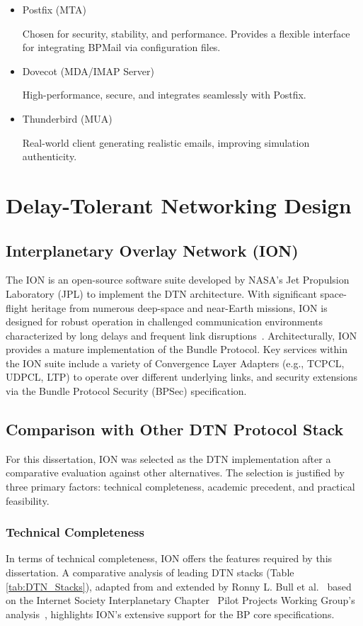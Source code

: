 \begin{itemize}
    \item Postfix (MTA)
    
    Chosen for security, stability, and performance. Provides a flexible interface for integrating BPMail via configuration files.
    \item Dovecot (MDA/IMAP Server)
    
    High-performance, secure, and integrates seamlessly with Postfix.
    \item Thunderbird (MUA)
    
    Real-world client generating realistic emails, improving simulation authenticity.
\end{itemize}

\section{Delay-Tolerant Networking Design}
\subsection{Interplanetary Overlay Network (ION)}
The ION is an open-source software suite developed by NASA's Jet Propulsion Laboratory (JPL) to implement the DTN architecture. With significant space-flight heritage from numerous deep-space and near-Earth missions, ION is designed for robust operation in challenged communication environments characterized by long delays and frequent link disruptions~\cite{burleigh2007interplanetary}. Architecturally, ION provides a mature implementation of the Bundle Protocol. Key services within the ION suite include a variety of Convergence Layer Adapters (e.g., TCPCL, UDPCL, LTP) to operate over different underlying links, and security extensions via the Bundle Protocol Security (BPSec) specification.

\subsection{Comparison with Other DTN Protocol Stack}
For this dissertation, ION was selected as the DTN implementation after a comparative evaluation against other alternatives. The selection is justified by three primary factors: technical completeness, academic precedent, and practical feasibility.

\subsubsection*{Technical Completeness}
In terms of technical completeness, ION offers the features required by this dissertation. A comparative analysis of leading DTN stacks (Table \ref{tab:DTN_Stacks}), adapted from and extended by Ronny L. Bull et al.~\cite{bull2024network} based on the Internet Society Interplanetary Chapter~\cite{ipnsig2023_home} Pilot Projects Working Group’s analysis~\cite{ipnsig2023_bp_impl}, highlights ION's extensive support for the BP core specifications.

